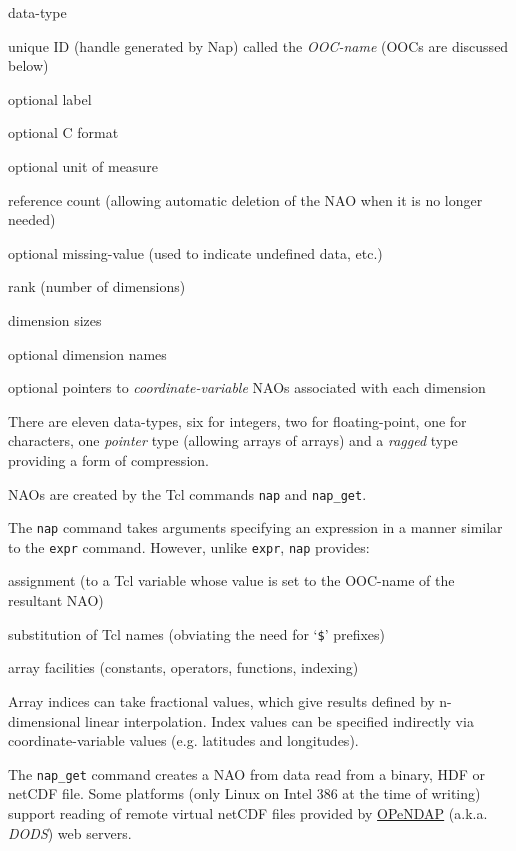\begin{bullets}
    \item data-type
    \item unique ID (handle generated by Nap) called the 
    \emph{OOC-name} (OOCs are discussed below)
    \item optional label
    \item optional C format
    \item optional unit of measure
    \item reference count (allowing automatic deletion of the NAO when it
    is no longer needed)
    \item optional missing-value (used to indicate undefined data,
    etc.)
    \item rank (number of dimensions)
    \item dimension sizes
    \item optional dimension names
    \item optional pointers to 
    \emph{coordinate-variable} NAOs associated with each
    dimension
\end{bullets}

There are eleven data-types, six for integers, two for
  floating-point, one for characters, one 
  \emph{pointer} type (allowing arrays of arrays) and a 
  \emph{ragged} type providing a form of compression.

NAOs are created by the Tcl commands \texttt{nap} and \texttt{nap\_get}.

The \texttt{nap} command takes arguments specifying an expression in a manner similar to the 
  \texttt{expr} command.
However, unlike 
  \texttt{expr}, 
  \texttt{nap} provides:
\begin{bullets}
\item assignment (to a Tcl variable whose value is set to the OOC-name of the resultant NAO)
\item substitution of Tcl names (obviating the need for `\texttt{\$}' prefixes)
\item array facilities (constants, operators, functions, indexing)
\end{bullets}

Array indices can take fractional values, which give results defined by
  n-dimensional linear interpolation.
Index values can be specified
  indirectly via coordinate-variable values (e.g. latitudes and
  longitudes).

The \texttt{nap\_get} command creates a NAO from data read from a
  binary, HDF or netCDF file. Some platforms (only Linux on Intel 386
  at the time of writing) support reading of remote virtual netCDF
  files provided by 
  \href{http://www.opendap.org/}{OPeNDAP} (a.k.a. 
  \emph{DODS}) web servers.

